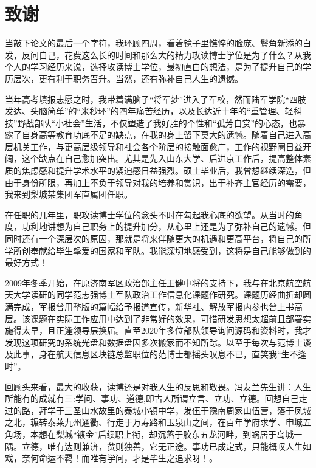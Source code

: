 \chapter[致谢]{致\quad 谢}%

当敲下论文的最后一个字符，我环顾四周，看着镜子里憔悴的脸庞、鬓角新添的白发，反问自己，花费这么长的时间和那么大的精力攻读博士学位是为了什么？从我个人的学习经历来说，选择攻读博士学位，最初直白的想法，是为了提升自己的学历层次，更有利于职务晋升。当然，还有弥补自己人生的遗憾。

当年高考填报志愿之时，我带着满脑子“将军梦”进入了军校，然而陆军学院“四肢发达、头脑简单”的“米秒环”的四年痛苦经历，以及长达近十年的“重管理、轻科技”野战部队“小社会”生活，不仅塑造了我好胜的个性和“孤芳自赏”的心态，也暴露了自身高等教育功底不足的缺点，在我的身上留下莫大的遗憾。随着自己进入高层机关工作，与更高层级领导和社会各个阶层的接触面愈广，工作的视野圈日益开阔，这个缺点在自己愈加突出。尤其是先入山东大学、后进京工作后，提高整体素质的焦虑感和提升学术水平的紧迫感日益强烈。硕士毕业后，我曾想继续深造，但由于身份所限，再加上不负于领导对我的培养和赏识，出于补齐主官经历的需要，我来到梨城某集团军直属团任职。

在任职的几年里，职攻读博士学位的念头不时在勾起我心底的欲望。从当时的角度，功利地讲想为自己职务上的提升加分，从心里上还是为了弥补自己的遗憾。但同时还有一个深层次的原因，那就是将来伴随更大的机遇和更高平台，将自己的所学所创奉献给毕生挚爱的国家和军队。我能深切地感受到，这将是自己能够做到的最好方式！

2009年冬季开始，在原济南军区政治部主任王健中将的支持下，我与在北京航空航天大学读研的同学范志强博士军队政治工作信息化课题作研究。课题历经曲折却圆满完成，军报曾用整版的篇幅给予报道宣传，新华社、解放军报内参也曾上书高层。该课题在实际工作应用中达到了非常好的效果，可惜研发思想太超前且部署实施得太早，且正逢领导层换届。直至2020年多位部队领导询问源码和资料时，我才发现这项研究的系统光盘和数据盘因多次搬家而不知所踪。以至于每次与范博士谈及此事，身在航天信息区块链总监职位的范博士都摇头叹息不已，直笑我“生不逢时”。

回顾头来看，最大的收获，读博还是对我人生的反思和敬畏。冯友兰先生讲：人生所能有的成就有三:学问、事功、道德,即古人所谓立言、立功、立德。回想自己走过的路，拜学于三圣山水故里的泰城小镇中学，发伍于豫南周家山伍营，落于凤城之北，辗转泰莱九州通衢、行走于万寿路和玉泉山之间，在百年学府求学、申城五角场，本想在梨城“镀金”后续职上衔，却沉落于胶东五龙河畔，到蜗居于岛城一隅。立德，唯有达则兼济，贫则独善，它无正途。事功已成定式，只能概叹人生如戏，奈何命运不羁！而唯有学问，才是毕生之追求呀！。

